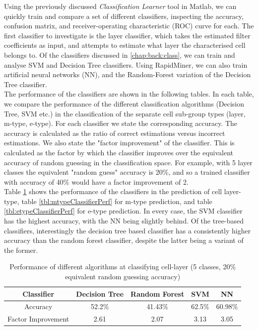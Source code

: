 \par

Using the previously discussed \emph{Classification Learner} tool in Matlab, we can quickly train and compare a set of different classifiers, inspecting the accuracy, confusion matrix, and receiver-operating characteristic (ROC) curve for each. The first classifier to investigate is the layer classifier, which takes the estimated filter coefficients as input, and attempts to estimate what layer the characterised cell belongs to. Of the classifiers discussed in \ref{chap:back:class}, we can train and analyse SVM and Decision Tree classifiers. Using RapidMiner, we can also train artificial neural networks (NN), and the Random-Forest variation of the Decision Tree classifier.\\
The performance of the classifiers are shown in the following tables. In each table, we compare the performance of the different classification algorithms (Decision Tree, SVM etc.) in the classification of the separate cell sub-group types (layer, m-type, e-type). For each classifier we state the corresponding accuracy. The accuracy is calculated as the ratio of correct estimations versus incorrect estimations. We also state the "factor improvement" of the classifier. This is calculated as the factor by which the classifier improves over the equivalent accuracy of random guessing in the classification space. For example, with 5 layer classes the equivalent "random guess" accuracy is 20\%, and so a trained classifier with accuracy of 40\% would have a factor improvement of 2. \\

Table \ref{tbl:layerClassifierPerf} shows the performance of the classifiers in the prediction of cell layer-type, table \ref{tbl:mtypeClassifierPerf} for m-type prediction, and table \ref{tbl:etypeClassifierPerf} for e-type prediction. In every case, the SVM classifier has the highest accuracy, with the NN being slightly behind. Of the tree-based classifiers, interestingly the decision tree based classifier has a consistently higher accuracy than the random forest classifier, despite the latter being a variant of the former. 


\begin{table}[h]
    \centering
    \begin{tabular}{|c||c|c|c|c|}
        \hline
        Classifier & Decision Tree & Random Forest & SVM & NN\\
        \hline\hline
        Accuracy & 52.2\% & 41.43\% & 62.5\% & 60.98\%\\
        \hline
        Factor Improvement & 2.61 & 2.07 & 3.13 & 3.05 \\
        \hline
    \end{tabular}
    \caption{Performance of different algorithms at classifying cell-layer (5 classes, 20\% equivalent random guessing accuracy)}
    \label{tbl:layerClassifierPerf}
\end{table}

